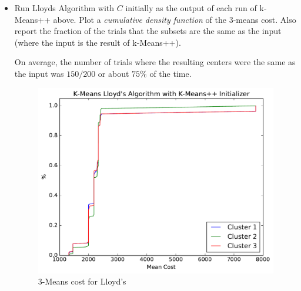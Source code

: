 \documentclass[11pt]{article}
\newcommand{\D}{\textsf{D}}
\begin{document}
\begin{itemize}
\item  Run Lloyds Algorithm with $C$ initially as the output of each run of \textsf{k-Means++} above.  Plot a \emph{cumulative density function} of the $3$-means cost.  Also report the fraction of the trials that the subsets are the same as the input (where the input is the result of \textsf{k-Means++}).  

On average, the number of trials where the resulting centers were the same as the input was $150/200$ or about $75\%$ of the time.


\begin{figure}[H]
\centering
\includegraphics[width=.75\textwidth]{kmeanspp_lloyds.pdf}
\caption{$3$-Means cost for Lloyd's}
\end{figure}
\end{itemize}

%
%
%
%
\end{document}
